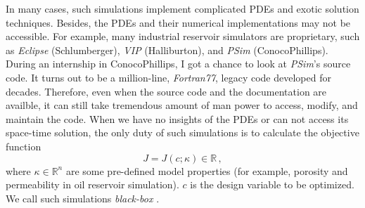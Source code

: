 \documentclass[a4paper,onecolumn]{article}
\theoremstyle{remark}
\begin{document}
\noindent In many cases, such simulations implement complicated PDEs and exotic solution techniques.
Besides, the PDEs and their numerical implementations may not
be accessible. For example, many industrial reservoir simulators are proprietary, such as \textit{Eclipse} (Schlumberger), 
\textit{VIP} (Halliburton), and \textit{PSim} (ConocoPhillips). During an internship in ConocoPhillips, 
I got a chance to
look at \textit{PSim}'s source code. It turns out to be a million-line, \textit{Fortran77}, legacy code developed for decades.
Therefore, even when the source code and the documentation are availble, it can still take tremendous amount of man power
to access, modify, and maintain the code.
When we have no insights of the PDEs or can not access its space-time solution,
the only duty of such simulations is to calculate the objective function
\begin{equation}
    J = J(c;\kappa) \in \mathbb{R}\,,
\end{equation}
where $\kappa\in \mathbb{R}^n$ are some pre-defined model properties (for example, porosity and permeability in oil reservoir simulation).
$c$ is the design variable to be optimized. 
We call such simulations \emph{black-box} \cite{review of black-box modeling}.\\
\end{document}
